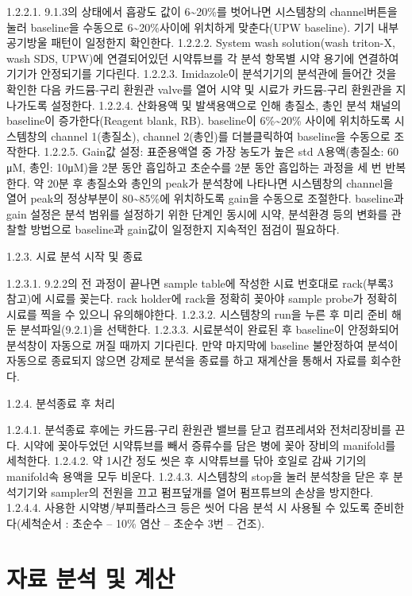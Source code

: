 \documentclass[
]{book}
\begin{document}
1.2.2.1. 9.1.3의 상태에서 흡광도 값이 6\textasciitilde20\%를 벗어나면 시스템창의 channel버튼을 눌러 baseline을 수동으로 6\textasciitilde20\%사이에 위치하게 맞춘다(UPW baseline). 기기 내부 공기방울 패턴이 일정한지 확인한다.
1.2.2.2. System wash solution(wash triton-X, wash SDS, UPW)에 연결되어있던 시약튜브를 각 분석 항목별 시약 용기에 연결하여 기기가 안정되기를 기다린다.
1.2.2.3. Imidazole이 분석기기의 분석관에 들어간 것을 확인한 다음 카드뮴-구리 환원관 valve를 열어 시약 및 시료가 카드뮴-구리 환원관을 지나가도록 설정한다.
1.2.2.4. 산화용액 및 발색용액으로 인해 총질소, 총인 분석 채널의 baseline이 증가한다(Reagent blank, RB). baseline이 6\%\textasciitilde20\% 사이에 위치하도록 시스템창의 channel 1(총질소), channel 2(총인)를 더블클릭하여 baseline을 수동으로 조작한다.
1.2.2.5. Gain값 설정: 표준용액열 중 가장 농도가 높은 std A용액(총질소: 60 μM, 총인: 10μM)을 2분 동안 흡입하고 초순수를 2분 동안 흡입하는 과정을 세 번 반복한다. 약 20분 후 총질소와 총인의 peak가 분석창에 나타나면 시스템창의 channel을 열어 peak의 정상부분이 80\textasciitilde85\%에 위치하도록 gain을 수동으로 조절한다. baseline과 gain 설정은 분석 범위를 설정하기 위한 단계인 동시에 시약, 분석환경 등의 변화를 관찰할 방법으로 baseline과 gain값이 일정한지 지속적인 점검이 필요하다.

1.2.3. 시료 분석 시작 및 종료

1.2.3.1. 9.2.2의 전 과정이 끝나면 sample table에 작성한 시료 번호대로 rack(부록3 참고)에 시료를 꽂는다. rack holder에 rack을 정확히 꽂아야 sample probe가 정확히 시료를 찍을 수 있으니 유의해야한다.
1.2.3.2. 시스템창의 run을 누른 후 미리 준비 해둔 분석파일(9.2.1)을 선택한다.
1.2.3.3. 시료분석이 완료된 후 baseline이 안정화되어 분석창이 자동으로 꺼질 때까지 기다린다. 만약 마지막에 baseline 불안정하여 분석이 자동으로 종료되지 않으면 강제로 분석을 종료를 하고 재계산을 통해서 자료를 회수한다.

1.2.4. 분석종료 후 처리

1.2.4.1. 분석종료 후에는 카드뮴-구리 환원관 밸브를 닫고 컴프레셔와 전처리장비를 끈다. 시약에 꽂아두었던 시약튜브를 빼서 증류수를 담은 병에 꽂아 장비의 manifold를 세척한다.
1.2.4.2. 약 1시간 정도 씻은 후 시약튜브를 닦아 호일로 감싸 기기의 manifold속 용액을 모두 비운다.
1.2.4.3. 시스템창의 stop을 눌러 분석창을 닫은 후 분석기기와 sampler의 전원을 끄고 펌프덮개를 열어 펌프튜브의 손상을 방지한다.
1.2.4.4. 사용한 시약병/부피플라스크 등은 씻어 다음 분석 시 사용될 수 있도록 준비한다(세척순서 : 초순수 -- 10\% 염산 -- 초순수 3번 -- 건조).

\hypertarget{uxc790uxb8cc-uxbd84uxc11d-uxbc0f-uxacc4uxc0b0-2}{%
\section{자료 분석 및 계산}\label{uxc790uxb8cc-uxbd84uxc11d-uxbc0f-uxacc4uxc0b0-2}}
\end{document}
